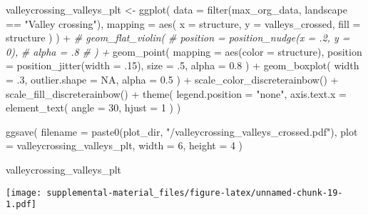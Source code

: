\documentclass[
]{book}
\newenvironment{Shaded}{\begin{snugshade}}{\end{snugshade}}
\newcommand{\AttributeTok}[1]{\textcolor[rgb]{0.77,0.63,0.00}{#1}}
\newcommand{\CommentTok}[1]{\textcolor[rgb]{0.56,0.35,0.01}{\textit{#1}}}
\newcommand{\ConstantTok}[1]{\textcolor[rgb]{0.00,0.00,0.00}{#1}}
\newcommand{\DecValTok}[1]{\textcolor[rgb]{0.00,0.00,0.81}{#1}}
\newcommand{\FloatTok}[1]{\textcolor[rgb]{0.00,0.00,0.81}{#1}}
\newcommand{\FunctionTok}[1]{\textcolor[rgb]{0.00,0.00,0.00}{#1}}
\newcommand{\NormalTok}[1]{#1}
\newcommand{\OtherTok}[1]{\textcolor[rgb]{0.56,0.35,0.01}{#1}}
\newcommand{\SpecialCharTok}[1]{\textcolor[rgb]{0.00,0.00,0.00}{#1}}
\newcommand{\StringTok}[1]{\textcolor[rgb]{0.31,0.60,0.02}{#1}}
\begin{document}
\begin{Shaded}
\begin{Highlighting}[]
\NormalTok{valleycrossing\_valleys\_plt }\OtherTok{\textless{}{-}} \FunctionTok{ggplot}\NormalTok{(}
    \AttributeTok{data =} \FunctionTok{filter}\NormalTok{(max\_org\_data, landscape }\SpecialCharTok{==} \StringTok{"Valley crossing"}\NormalTok{),}
    \AttributeTok{mapping =} \FunctionTok{aes}\NormalTok{(}
      \AttributeTok{x =}\NormalTok{ structure,}
      \AttributeTok{y =}\NormalTok{ valleys\_crossed,}
      \AttributeTok{fill =}\NormalTok{ structure}
\NormalTok{    )}
\NormalTok{  ) }\SpecialCharTok{+}
  \CommentTok{\# geom\_flat\_violin(}
  \CommentTok{\#   position = position\_nudge(x = .2, y = 0),}
  \CommentTok{\#   alpha = .8}
  \CommentTok{\# ) +}
  \FunctionTok{geom\_point}\NormalTok{(}
    \AttributeTok{mapping =} \FunctionTok{aes}\NormalTok{(}\AttributeTok{color =}\NormalTok{ structure),}
    \AttributeTok{position =} \FunctionTok{position\_jitter}\NormalTok{(}\AttributeTok{width =}\NormalTok{ .}\DecValTok{15}\NormalTok{),}
    \AttributeTok{size =}\NormalTok{ .}\DecValTok{5}\NormalTok{,}
    \AttributeTok{alpha =} \FloatTok{0.8}
\NormalTok{  ) }\SpecialCharTok{+}
  \FunctionTok{geom\_boxplot}\NormalTok{(}
    \AttributeTok{width =}\NormalTok{ .}\DecValTok{3}\NormalTok{,}
    \AttributeTok{outlier.shape =} \ConstantTok{NA}\NormalTok{,}
    \AttributeTok{alpha =} \FloatTok{0.5}
\NormalTok{  ) }\SpecialCharTok{+}
  \FunctionTok{scale\_color\_discreterainbow}\NormalTok{() }\SpecialCharTok{+}
  \FunctionTok{scale\_fill\_discreterainbow}\NormalTok{() }\SpecialCharTok{+}
  \FunctionTok{theme}\NormalTok{(}
    \AttributeTok{legend.position =} \StringTok{"none"}\NormalTok{,}
    \AttributeTok{axis.text.x =} \FunctionTok{element\_text}\NormalTok{(}
      \AttributeTok{angle =} \DecValTok{30}\NormalTok{,}
      \AttributeTok{hjust =} \DecValTok{1}
\NormalTok{    )}
\NormalTok{  )}

\FunctionTok{ggsave}\NormalTok{(}
  \AttributeTok{filename =} \FunctionTok{paste0}\NormalTok{(plot\_dir, }\StringTok{"/valleycrossing\_valleys\_crossed.pdf"}\NormalTok{),}
  \AttributeTok{plot =}\NormalTok{ valleycrossing\_valleys\_plt,}
  \AttributeTok{width =} \DecValTok{6}\NormalTok{,}
  \AttributeTok{height =} \DecValTok{4}
\NormalTok{)}

\NormalTok{valleycrossing\_valleys\_plt}
\end{Highlighting}
\end{Shaded}

\texttt{[image: supplemental-material\_files/figure-latex/unnamed-chunk-19-1.pdf]}
\end{document}
